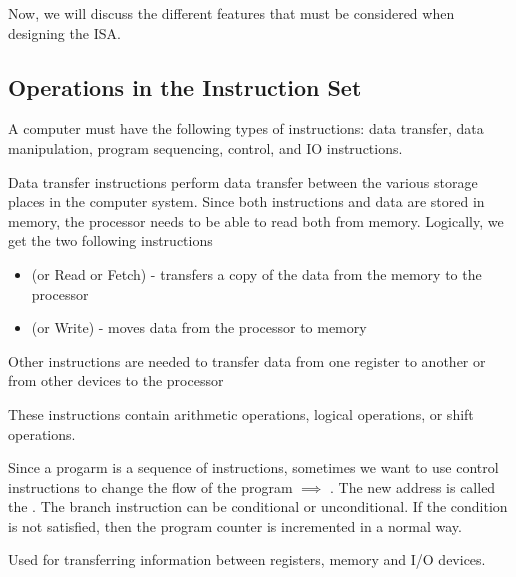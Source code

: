 \documentclass[12pt]{scrartcl}
\begin{document}
Now, we will discuss the different features that must be considered when designing the ISA. 

\subsection{Operations in the Instruction Set}

\begin{note}
  A computer must have the following types of instructions: data transfer, data manipulation, 
  program sequencing, control, and IO instructions. 
\end{note}

\begin{definition}
  Data transfer instructions perform data transfer between the various storage places in the 
  computer system. Since both instructions and data are stored in memory, the processor needs 
  to be able to read both from memory. Logically, we get the two following instructions 
  \begin{itemize}
    \item {} (or Read or Fetch) - transfers a copy of the data from the memory to the processor 
    \item {} (or Write) - moves data from the processor to memory
  \end{itemize}
  Other instructions are needed to transfer data from one register to another or from 
  other devices to the processor 
\end{definition}

\begin{definition}
  These instructions contain arithmetic operations, logical operations, or shift operations. 
\end{definition}

\begin{definition}
  Since a progarm is a sequence of instructions, sometimes we want to use control instructions
  to change the flow of the program $\implies$ . The new address 
  is called the . The branch instruction can be 
  conditional or unconditional. If the condition is not satisfied, then the
  program counter is incremented in a normal way.
\end{definition}

\begin{definition}
  Used for transferring information between registers, memory and I/O devices. 
\end{definition}
\end{document}
